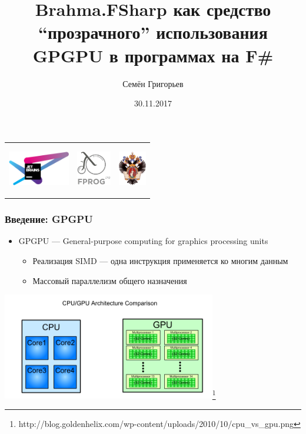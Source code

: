 \documentclass[xcolor=table]{beamer}
\title[Brahma.FSharp]{Brahma.FSharp как средство ``прозрачного'' использования GPGPU в программах на F\#}
\institute[СПбГУ]{
JetBrains Research, лаборатория языковых инструментов \\
Санкт-Петербургский государственный университет
}
\author[Семён Григорьев]{Семён Григорьев}
\date{30.11.2017}
\begin{document}
{
\begin{frame}[fragile]
  \begin{tabular}{p{2.5cm} p{6.5cm} p{2cm}}
   \begin{center}
      \includegraphics[height=1.5cm]{pictures/JBLogo3.pdf}
    \end{center}
    &
    \begin{center}
      \includegraphics[height=1.5cm]{pictures/fprog_logo.png}
    \end{center} 
    &
    \begin{center}
      \includegraphics[height=1.5cm]{pictures/SPbGU_Logo.png}
    \end{center}
  \end{tabular}
  \titlepage
\end{frame}
}


\begin{frame}[fragile]
  \transwipe[direction=90]
  \frametitle{Введение: GPGPU}
  \begin{itemize}
  \item GPGPU --- General-purpose computing for graphics processing units
    \begin{itemize}
        \item Реализация SIMD --- одна инструкция применяется ко многим данным
        \item Массовый параллелизм общего назначения
    \end{itemize}
    \end{itemize}
    \begin{center}
      \includegraphics[width=0.7\textwidth]{pictures/cpu_vs_gpu.png}\footnote{\small{http://blog.goldenhelix.com/wp-content/uploads/2010/10/cpu\_vs\_gpu.png}}
    \end{center} 
\end{frame}
\end{document}
